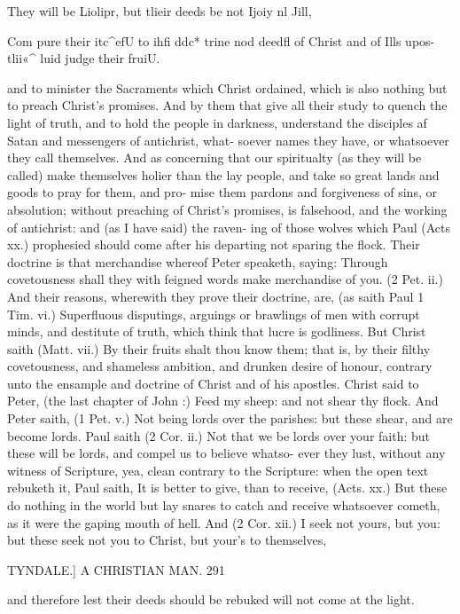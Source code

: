 \documentclass{custom}
\begin{document}
{{They will 
be Liolipr, 
but tlieir 
deeds be 
not Ijoiy nl 
Jill, 

Com pure 
their itc^efU 
to ihfi ddc* 
trine nod 
deedfl of 
Christ and 
of Ills upos- 
tlii«^ luid 
judge their 
fruiU. 

and to minister the Sacraments which Christ ordained, 
which is also nothing but to preach Christ's promises. 
And by them that give all their study to quench the light 
of truth, and to hold the people in darkness, understand 
the disciples af Satan and messengers of antichrist, what- 
soever names they have, or whatsoever they call themselves. 
And as concerning that our spiritualty (as they will be
called) make themselves holier than the lay people, and 
take so great lands and goods to pray for them, and pro-
mise them pardons and forgiveness of sins, or absolution; 
without preaching of Christ's promises, is falsehood, and 
the working of antichrist: and (as I have said) the raven-
ing of those wolves which Paul (Acts xx.) prophesied 
should come after his departing not sparing the flock. 
Their doctrine is that merchandise whereof Peter speaketh,
saying: Through covetousness shall they with feigned words 
make merchandise of you. (2 Pet. ii.) And their reasons,
wherewith they prove their doctrine, are, (as saith Paul 
1 Tim. vi.) Superfluous disputings, arguings or brawlings of 
men with corrupt minds, and destitute of truth, which 
think that lucre is godliness. But Christ saith (Matt. vii.) 
By their fruits shalt thou know them; that is, by their 
filthy covetousness, and shameless ambition, and drunken 
desire of honour, contrary unto the ensample and doctrine 
of Christ and of his apostles. Christ said to Peter, (the 
last chapter of John :) Feed my sheep: and not shear thy 
flock. And Peter saith, (1 Pet. v.) Not being lords over 
the parishes: but these shear, and are become lords. Paul 
saith (2 Cor. ii.) Not that we be lords over your faith: 
but these will be lords, and compel us to believe whatso- 
ever they lust, without any witness of Scripture, yea, clean 
contrary to the Scripture: when the open text rebuketh it, 
Paul saith, It is better to give, than to receive, (Acts. xx.) 
But these do nothing in the world but lay snares to catch 
and receive whatsoever cometh, as it were the gaping 
mouth of hell. And (2 Cor. xii.) I seek not yours, but you: 
but these seek not you to Christ, but your's to themselves, 


TYNDALE.]
A CHRISTIAN MAN.
291

and therefore lest their deeds should be rebuked will not 
come at the light. 

}}
\end{document}
